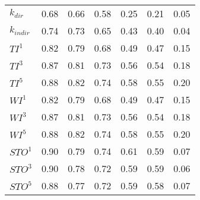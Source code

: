 \begin{table}[ht]
\begin{tabular}{lllllll}
\(\displaystyle k_{dir} \) &   {\color[HTML]{00D768} 0.68} & {\color[HTML]{EF2A00} 0.66} & {\color[HTML]{0051D7} 0.58} & {\color{orange} 0.25} & {\color[HTML]{6200D7} 0.21} & {\color[HTML]{9B9B9B} 0.05} \\ 
\(\displaystyle k_{indir} \) &   {\color[HTML]{EF2A00} 0.74} & {\color[HTML]{00D768} 0.73} & {\color[HTML]{0051D7} 0.65} & {\color[HTML]{6200D7} 0.43} & {\color{orange} 0.40} & {\color[HTML]{9B9B9B} 0.04} \\ 
\(\displaystyle TI^1 \) &   {\color[HTML]{EF2A00} 0.82} & {\color[HTML]{00D768} 0.79} & {\color[HTML]{0051D7} 0.68} & {\color[HTML]{6200D7} 0.49} & {\color{orange} 0.47} & {\color[HTML]{9B9B9B} 0.15} \\ 
\(\displaystyle TI^3 \) &   {\color[HTML]{EF2A00} 0.87} & {\color[HTML]{00D768} 0.81} & {\color[HTML]{0051D7} 0.73} & {\color{orange} 0.56} & {\color[HTML]{6200D7} 0.54} & {\color[HTML]{9B9B9B} 0.18} \\ 
\(\displaystyle TI^5 \) &   {\color[HTML]{EF2A00} 0.88} & {\color[HTML]{00D768} 0.82} & {\color[HTML]{0051D7} 0.74} & {\color{orange} 0.58} & {\color[HTML]{6200D7} 0.55} & {\color[HTML]{9B9B9B} 0.20} \\ 
\(\displaystyle WI^1 \) &   {\color[HTML]{EF2A00} 0.82} & {\color[HTML]{00D768} 0.79} & {\color[HTML]{0051D7} 0.68} & {\color[HTML]{6200D7} 0.49} & {\color{orange} 0.47} & {\color[HTML]{9B9B9B} 0.15} \\ 
\(\displaystyle WI^3 \) &   {\color[HTML]{EF2A00} 0.87} & {\color[HTML]{00D768} 0.81} & {\color[HTML]{0051D7} 0.73} & {\color{orange} 0.56} & {\color[HTML]{6200D7} 0.54} & {\color[HTML]{9B9B9B} 0.18} \\ 
\(\displaystyle WI^5 \) &   {\color[HTML]{EF2A00} 0.88} & {\color[HTML]{00D768} 0.82} & {\color[HTML]{0051D7} 0.74} & {\color{orange} 0.58} & {\color[HTML]{6200D7} 0.55} & {\color[HTML]{9B9B9B} 0.20} \\ 
\(\displaystyle STO^1 \) &   {\color[HTML]{00D768} 0.90} & {\color[HTML]{EF2A00} 0.79} & {\color[HTML]{0051D7} 0.74} & {\color{orange} 0.61} & {\color[HTML]{6200D7} 0.59} & {\color[HTML]{9B9B9B} 0.07} \\ 
\(\displaystyle STO^3 \) &   {\color[HTML]{00D768} 0.90} & {\color[HTML]{EF2A00} 0.78} & {\color[HTML]{0051D7} 0.72} & {\color{orange} 0.59} & {\color[HTML]{6200D7} 0.59} & {\color[HTML]{9B9B9B} 0.06} \\ 
\(\displaystyle STO^5 \) &   {\color[HTML]{00D768} 0.88} & {\color[HTML]{EF2A00} 0.77} & {\color[HTML]{0051D7} 0.72} & {\color[HTML]{6200D7} 0.59} & {\color{orange} 0.58} & {\color[HTML]{9B9B9B} 0.07} \\ 

\end{tabular}
\end{table}
